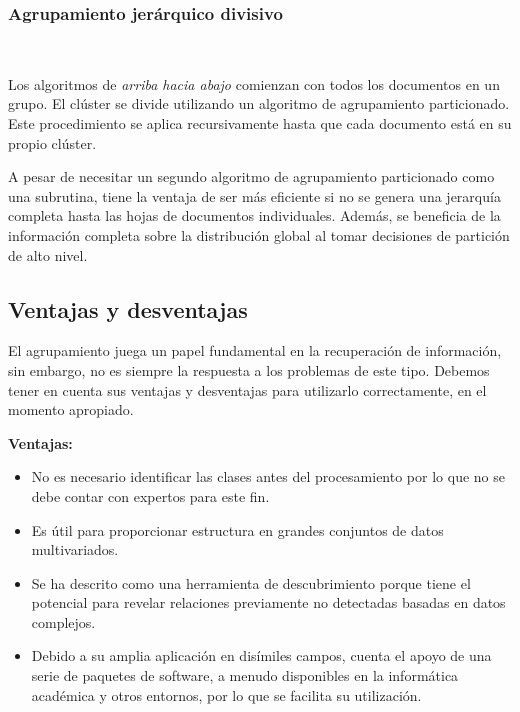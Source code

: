 \documentclass{llncs}
\begin{document}
\subsubsection{Agrupamiento jer\'arquico divisivo}

\textcolor{white}{.}

\vspace{0.5em}
Los algoritmos de \textit{arriba hacia abajo} comienzan con todos los documentos en un grupo. El clúster se divide utilizando un algoritmo de agrupamiento particionado. Este procedimiento se aplica recursivamente hasta que cada documento está en su
propio clúster.

A pesar de necesitar un segundo algoritmo de agrupamiento particionado como una subrutina, tiene la ventaja de ser más eficiente si no se genera una jerarquía completa hasta las hojas de documentos individuales. Adem\'as, se beneficia de la información completa sobre la distribución global al tomar decisiones de partición de alto nivel.

\subsection{Ventajas y desventajas} 

El agrupamiento juega un papel fundamental en la recuperaci\'on de informaci\'on, sin embargo, no es siempre la respuesta a los problemas de este tipo. Debemos tener en cuenta sus ventajas y desventajas para utilizarlo correctamente, en el momento apropiado. 

\vspace{0.5em}
\textbf{Ventajas:}
\begin{itemize}
	\item No es necesario identificar las clases antes del procesamiento por lo que no se debe contar con expertos para este fin.
	
	\item Es útil para proporcionar estructura en grandes conjuntos de datos multivariados.
	
	\item Se ha descrito como una herramienta de descubrimiento porque tiene el potencial para revelar relaciones previamente no detectadas basadas en datos complejos.
	
	\item Debido a su amplia aplicación en dis\'imiles campos, cuenta el apoyo de una serie de paquetes de software, a menudo disponibles en la informática académica y otros entornos, por lo que se facilita su utilizaci\'on.
\end{itemize}
\end{document}
